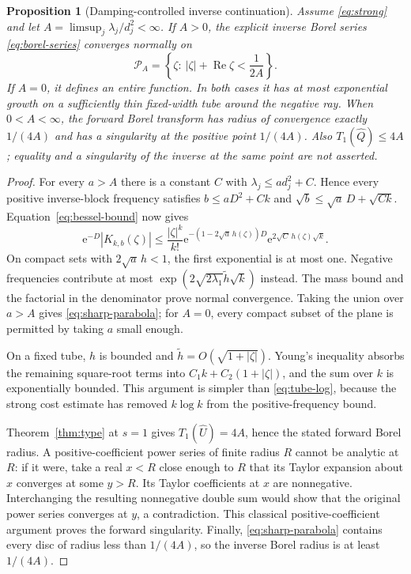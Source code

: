 \documentclass[11pt,a4paper]{article}
\numberwithin{equation}{section}
\newtheorem{proposition}[theorem]{Proposition}
\theoremstyle{definition}
\theoremstyle{remark}
\theoremstyle{definition}
\newcommand{\U}{\widehat U}
\newcommand{\Q}{\widehat Q}
\newcommand{\e}{\mathrm e}
\newcommand{\Ree}{\operatorname{Re}}
\begin{document}
\begin{proposition}[Damping-controlled inverse continuation]
\label{prop:sharp-borel}
Assume \eqref{eq:strong} and let
$A=\limsup_j\lambda_j/d_j^2<\infty$. If $A>0$, the explicit inverse
Borel series \eqref{eq:borel-series} converges normally on
\begin{equation}
 \mathcal P_A=\left\{\zeta:\ |\zeta|+\Ree\zeta<\frac1{2A}\right\}.
 \label{eq:sharp-parabola}
\end{equation}
If $A=0$, it defines an entire function. In both cases it has at most
exponential growth on a sufficiently thin fixed-width tube around the
negative ray. When $0<A<\infty$, the forward Borel transform has radius
of convergence exactly $1/(4A)$ and has a singularity at the positive
point $1/(4A)$. Also $T_1(\Q)\le4A$; equality and a singularity of the
inverse at the same point are not asserted.
\end{proposition}
\begin{proof}
For every $a>A$ there is a constant $C$ with
$\lambda_j\le a d_j^2+C$. Hence every positive inverse-block frequency
satisfies $b\le aD^2+Ck$ and
$\sqrt b\le\sqrt a\,D+\sqrt{Ck}$. Equation~\eqref{eq:bessel-bound}
now gives
\[
 \e^{-D}|K_{k,b}(\zeta)|
 \le\frac{|\zeta|^k}{k!}
    \e^{-(1-2\sqrt a\,h(\zeta))D}
    \e^{2\sqrt C\,h(\zeta)\sqrt k}.
\]
On compact sets with $2\sqrt a\,h<1$, the first exponential is at most
one. Negative frequencies contribute at most
$\exp(2\sqrt{2\lambda_1}\widetilde h\sqrt k)$ instead. The mass bound
and the factorial in the denominator prove normal convergence. Taking
the union over $a>A$ gives \eqref{eq:sharp-parabola}; for $A=0$, every
compact subset of the plane is permitted by taking $a$ small enough.

On a fixed tube, $h$ is bounded and $\widetilde h=O(\sqrt{1+|\zeta|})$.
Young's inequality absorbs the remaining square-root terms into
$C_1k+C_2(1+|\zeta|)$, and the sum over $k$ is exponentially bounded.
This argument is simpler than \eqref{eq:tube-log}, because the strong
cost estimate has removed $k\log k$ from the positive-frequency bound.

Theorem~\ref{thm:type} at $s=1$ gives $T_1(\U)=4A$, hence the stated
forward Borel radius. A positive-coefficient power series of finite
radius $R$ cannot be analytic at $R$: if it were, take a real $x<R$
close enough to $R$ that its Taylor expansion about $x$ converges at
some $y>R$. Its Taylor coefficients at $x$ are nonnegative. Interchanging
the resulting nonnegative double sum would show that the original
power series converges at $y$, a contradiction. This classical
positive-coefficient argument proves the forward singularity.
Finally, \eqref{eq:sharp-parabola} contains every disc of radius less
than $1/(4A)$, so the inverse Borel radius is at least $1/(4A)$.
\end{proof}
\end{document}
